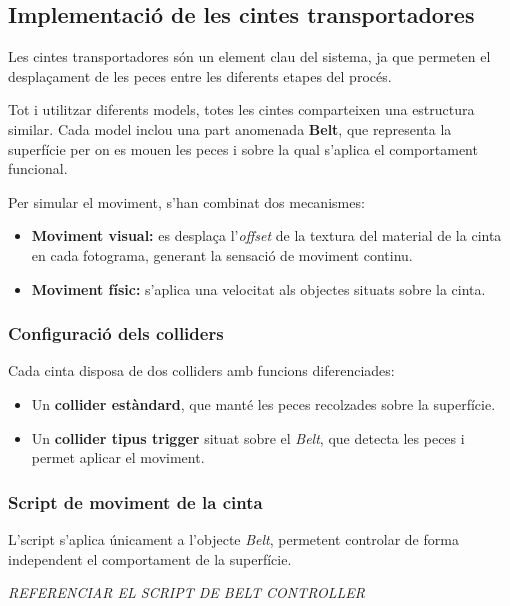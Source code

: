 \documentclass[12pt,a4paper]{report}
\begin{document}
\subsection{Implementació de les cintes transportadores}

Les cintes transportadores són un element clau del sistema, ja que permeten el desplaçament de les peces entre les diferents etapes del procés.

Tot i utilitzar diferents models, totes les cintes comparteixen una estructura similar. Cada model inclou una part anomenada \textbf{Belt}, que representa la superfície per on es mouen les peces i sobre la qual s'aplica el comportament funcional.


Per simular el moviment, s'han combinat dos mecanismes:

\begin{itemize}
\item \textbf{Moviment visual:} es desplaça l'\textit{offset} de la textura del material de la cinta en cada fotograma, generant la sensació de moviment continu.
\item \textbf{Moviment físic:} s'aplica una velocitat als objectes situats sobre la cinta.
\end{itemize}

\subsubsection{Configuració dels colliders}

Cada cinta disposa de dos colliders \cite{UnityColliders} amb funcions diferenciades:

\begin{itemize}
\item Un \textbf{collider estàndard}, que manté les peces recolzades sobre la superfície.
\item Un \textbf{collider tipus trigger} situat sobre el \textit{Belt}, que detecta les peces i permet aplicar el moviment.
\end{itemize}



\subsubsection{Script de moviment de la cinta}

L'script s'aplica únicament a l'objecte \textit{Belt}, permetent controlar de forma independent el comportament de la superfície.


\textit{REFERENCIAR EL SCRIPT DE BELT CONTROLLER}
\end{document}
